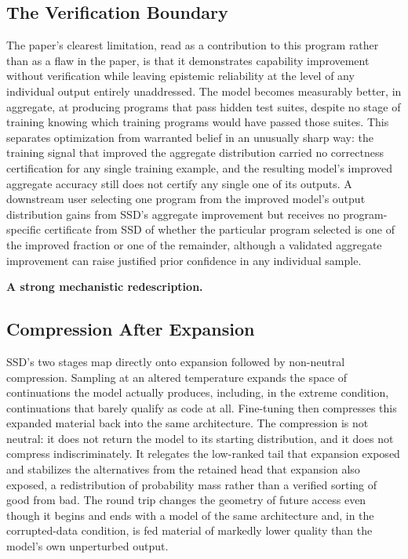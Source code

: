 \documentclass[11pt]{article}
\begin{document}
\subsection{The Verification Boundary}

The paper's clearest limitation, read as a contribution to this program rather than as a flaw in the paper, is that it demonstrates capability improvement without verification while leaving epistemic reliability at the level of any individual output entirely unaddressed. The model becomes measurably better, in aggregate, at producing programs that pass hidden test suites, despite no stage of training knowing which training programs would have passed those suites. This separates optimization from warranted belief in an unusually sharp way: the training signal that improved the aggregate distribution carried no correctness certification for any single training example, and the resulting model's improved aggregate accuracy still does not certify any single one of its outputs. A downstream user selecting one program from the improved model's output distribution gains from SSD's aggregate improvement but receives no program-specific certificate from SSD of whether the particular program selected is one of the improved fraction or one of the remainder, although a validated aggregate improvement can raise justified prior confidence in any individual sample.

\textbf{A strong mechanistic redescription.}

\subsection{Compression After Expansion}

SSD's two stages map directly onto expansion followed by non-neutral compression. Sampling at an altered temperature expands the space of continuations the model actually produces, including, in the extreme condition, continuations that barely qualify as code at all. Fine-tuning then compresses this expanded material back into the same architecture. The compression is not neutral: it does not return the model to its starting distribution, and it does not compress indiscriminately. It relegates the low-ranked tail that expansion exposed and stabilizes the alternatives from the retained head that expansion also exposed, a redistribution of probability mass rather than a verified sorting of good from bad. The round trip changes the geometry of future access even though it begins and ends with a model of the same architecture and, in the corrupted-data condition, is fed material of markedly lower quality than the model's own unperturbed output.
\end{document}
